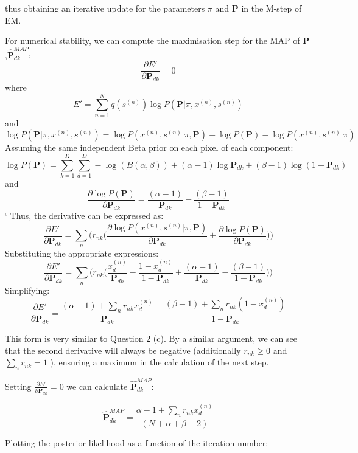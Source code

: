 \documentclass[12pt]{article}
\begin{document}
\begin{enumerate}
{thus obtaining an iterative update for the parameters $\pi$ and $\mathbf{P}$ in the M-step of EM.

For numerical stability, we can compute the maximisation step for the MAP of $\mathbf{P}$,$\hat{\mathbf{P}}_{dk}^{MAP}$:
$$\frac{\partial E'}{\partial \mathbf{P}_{dk}} = 0$$
where
$$E' = \sum_{n=1}^N q(s^{(n)}) \log P(\mathbf{P} | \pi, x^{(n)}, s^{(n)})$$
and
$$\log P(\mathbf{P} | \pi, x^{(n)}, s^{(n)}) = \log P( x^{(n)}, s^{(n)} | \pi, \mathbf{P} ) + \log P(\mathbf{P}) - \log P(x^{(n)}, s^{(n)} | \pi)$$
Assuming the same independent Beta prior on each pixel of each component:
$$\log P(\mathbf{P}) = \sum_{k=1}^K \sum_{d=1}^D -\log (B(\alpha, \beta)) + (\alpha-1)\log \mathbf{P}_{dk} + (\beta-1)\log(1-\mathbf{P}_{dk})$$
and
$$\frac{\partial \log P(\mathbf{P})}{\partial \mathbf{P}_{dk}} = \frac{(\alpha-1)}{\mathbf{P}_{dk}} -  \frac{(\beta-1)}{1-\mathbf{P}_{dk}}$$`
Thus, the derivative can be expressed as:
$$\frac{\partial E'}{\partial \mathbf{P}_{dk}} =  \sum_n \Bigg(r_{nk} \bigg(\frac{\partial \log P( x^{(n)}, s^{(n)} | \pi, \mathbf{P} )}{\partial \mathbf{P}_{dk}} + \frac{\partial \log P(\mathbf{P})}{\partial \mathbf{P}_{dk}} \bigg) \Bigg)$$
Substituting the appropriate expressions:
$$\frac{\partial E'}{\partial \mathbf{P}_{dk}} =  \sum_n \Bigg(r_{nk} \bigg(\frac{x^{(n)}_{d}}{ \mathbf{P}_{dk}}-\frac{1-x^{(n)}_{d}}{1-\mathbf{P}_{dk}} + \frac{(\alpha-1)}{\mathbf{P}_{dk}} -  \frac{(\beta-1)}{1-\mathbf{P}_{dk}} \bigg) \Bigg)$$
Simplifying:
$$\frac{\partial E'}{\partial \mathbf{P}_{dk}} =  \frac{(\alpha-1)+\sum_n r_{nk} x^{(n)}_{d}}{ \mathbf{P}_{dk}}-\frac{(\beta-1)+\sum_n r_{nk} (1-x^{(n)}_{d})}{1-\mathbf{P}_{dk}}$$

This form is very similar to Question 2 (c). By a similar argument, we can see that the second derivative will always be negative (additionally $r_{nk}\geq 0$ and $\sum_n r_{nk}=1$ ), ensuring a maximum in the calculation of the next step.

Setting $\frac{\partial E'}{\partial \mathbf{P}_{dk}}=0$ we can calculate $\hat{\mathbf{P}}_{dk}^{MAP}$:

$$\hat{\mathbf{P}}_{dk}^{MAP} = \frac{\alpha - 1 +\sum_n r_{nk} x^{(n)}_{d}}{(N+\alpha+\beta-2)}$$

\newpage
\item[(d)] Plotting the posterior likelihood as a function of the iteration number:

}
\end{enumerate}
\end{document}
